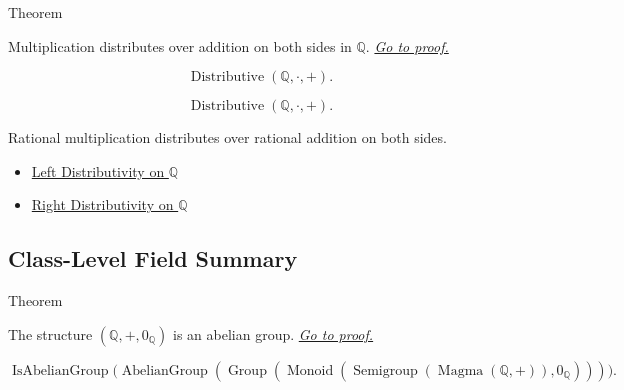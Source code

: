 \begin{theorembox}{Theorem}
\begin{theorem}
\label{thm:multiplication-distributes-over-addition-on-q}
Multiplication distributes over addition on both sides in $\mathbb{Q}$.
\hyperref[prf:multiplication-distributes-over-addition-on-q]{\textit{Go to proof.}}
\end{theorem}
\end{theorembox}

\begin{remark*}
\[
\operatorname{Distributive}(\mathbb{Q},\cdot,+).
\]
\end{remark*}

\begin{remark*}
\[
\operatorname{Distributive}(\mathbb{Q},\cdot,+).
\]
\end{remark*}

\begin{remark*}[Interpretation]
Rational multiplication distributes over rational addition on both sides.
\end{remark*}

\begin{dependencies}
\begin{itemize}
  \item \hyperref[thm:left-distributivity-on-q]{Left Distributivity on $\mathbb{Q}$}
  \item \hyperref[cor:right-distributivity-on-q]{Right Distributivity on $\mathbb{Q}$}
\end{itemize}
\end{dependencies}

\subsection*{Class-Level Field Summary}

\begin{theorembox}{Theorem}
\begin{theorem}
\label{thm:q-additive-abelian-group}
The structure $(\mathbb{Q},+,0_{\mathbb{Q}})$ 
is an abelian group.
\hyperref[prf:q-additive-abelian-group]{\textit{Go to proof.}}
\end{theorem}
\end{theorembox}

\begin{remark*}
\[
\operatorname{IsAbelianGroup}
\bigl(\operatorname{AbelianGroup}(
\operatorname{Group}(\operatorname{Monoid}(
\operatorname{Semigroup}(\operatorname{Magma}(\mathbb{Q},+)),
0_{\mathbb{Q}})))\bigr).
\]
\end{remark*}


